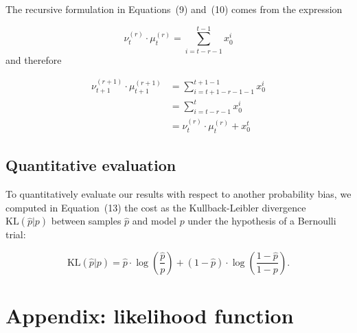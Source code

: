\documentclass[10pt,letterpaper]{article}
\newcommand{\KL}[2]{\text{KL}( #1 | #2 )}
\newcommand{\pa}[1]{\left( #1 \right)}
\newcommand{\eq}[1]{\begin{equation*}#1\end{equation*}}
\newcommand{\eqs}[1]{\begin{align*}#1\end{align*}}
\newcommand{\seeEq}[1]{Equation~\ref{eq:#1}}
\newcommand{\seeApp}[1]{Appendix~\ref{app:#1}}
\begin{document}
The recursive formulation in Equations~(9) %
 and~(10)%
 comes from the expression

 \eq{
\nu^{(r)}_{t} \cdot \mu^{(r)}_{t} = \sum_{i=t-r-1}^{t-1} x_0^i %
}
and therefore

\eqs{
\nu^{(r+1)}_{t+1} \cdot \mu^{(r+1)}_{t+1} 	&= \sum_{i=t+1-r-1-1}^{t+1-1} x_0^i  \\%
											&=  \sum_{i=t-r-1}^{t} x_0^i  \\%
											&= \nu^{(r)}_{t} \cdot  \mu^{(r)}_{t} +  x_0^t
}

%
%

\subsection{Quantitative evaluation}

To quantitatively evaluate our results with respect to another probability bias, we computed in Equation~(13) %
the cost as the Kullback-Leibler divergence  $\KL{\hat p}{p}$ between samples $\hat p$ and model $p$ under the hypothesis of a Bernoulli trial:

\begin{equation}
\KL{\hat p}{p} = \hat{p} \cdot\log\pa{\frac{\hat p}{p}} + (1-\hat p)\cdot \log\pa{\frac{1-\hat p}{1-p}}.
\end{equation}


\section{Appendix: likelihood function}
\label{app:likelihood}
\end{document}

